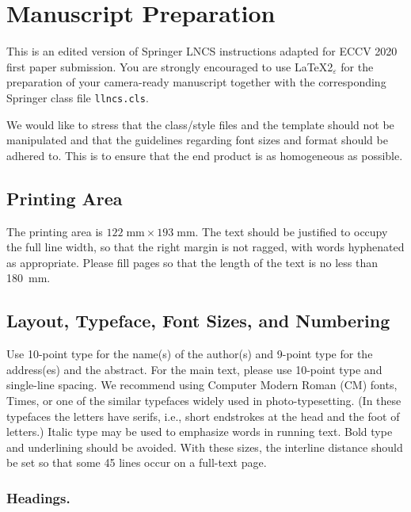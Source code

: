 \documentclass[runningheads]{llncs}
\begin{document}
\section{Manuscript Preparation}

This is an edited version of Springer LNCS instructions adapted
for ECCV 2020 first paper submission.
You are strongly encouraged to use \LaTeX2$_\varepsilon$ for the
preparation of your
camera-ready manuscript together with the corresponding Springer
class file \verb+llncs.cls+.

We would like to stress that the class/style files and the template
should not be manipulated and that the guidelines regarding font sizes
and format should be adhered to. This is to ensure that the end product
is as homogeneous as possible.

\subsection{Printing Area}
The printing area is $122  \; \mbox{mm} \times 193 \;
\mbox{mm}$.
The text should be justified to occupy the full line width,
so that the right margin is not ragged, with words hyphenated as
appropriate. Please fill pages so that the length of the text
is no less than 180~mm.

\subsection{Layout, Typeface, Font Sizes, and Numbering}
Use 10-point type for the name(s) of the author(s) and 9-point type for
the address(es) and the abstract. For the main text, please use 10-point
type and single-line spacing.
We recommend using Computer Modern Roman (CM) fonts, Times, or one
of the similar typefaces widely used in photo-typesetting.
(In these typefaces the letters have serifs, i.e., short endstrokes at
the head and the foot of letters.)
Italic type may be used to emphasize words in running text. Bold
type and underlining should be avoided.
With these sizes, the interline distance should be set so that some 45
lines occur on a full-text page.

\subsubsection{Headings.}
\end{document}
